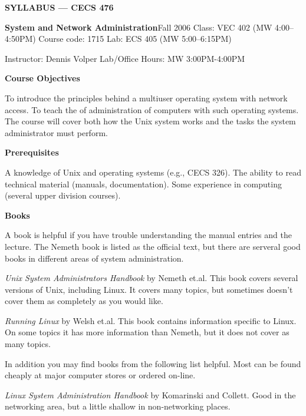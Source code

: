 
\centerline{{\bf SYLLABUS --- CECS 476}}
\vskip 5pt
{\obeylines\parindent 0pt
{\bf System and Network Administration}\hfill Fall 2006
Class: VEC 402 (MW 4:00--4:50PM) \hfill Course code: 1715 \hfill Lab: ECS 405 (MW 5:00--6:15PM)

Instructor: Dennis Volper \hfill Lab/Office Hours: MW 3:00PM-4:00PM

}
 
\vskip 5pt
\centerline{\bf Course Objectives}
 
To introduce the principles behind a multiuser operating system with network
access.
To teach the of administration of computers with such operating systems.
The course will cover both how the Unix system works
and the tasks the system administrator must perform.

\vskip 5pt
\centerline{\bf Prerequisites }

A knowledge of Unix and operating systems (e.g., CECS 326).
The ability to read technical material (manuals, documentation).
Some experience in computing (several upper division courses).
 
\vskip 5pt
\centerline{\bf Books }
 
A book is helpful if you have trouble understanding the manual entries
and the lecture.
The Nemeth book is listed as the official text, but there are serveral
good books in different areas of system administration.

{\it Unix System Administrators Handbook}
by Nemeth et.al.
This book covers several versions of Unix, including Linux.
It covers many topics, but sometimes doesn't cover them
as completely as you would like.

{\it Running Linux}
by Welsh et.al.
This book contains information specific to Linux.
On some topics it has more information than Nemeth,
but it does not cover as many topics.

In addition you may find books from the following list helpful. 
Most can be found cheaply at major
computer stores or ordered on-line.


{\it Linux System Administration Handbook}
by Komarinski and Collett. 
Good in the networking area, 
but a little shallow in non-networking places.

